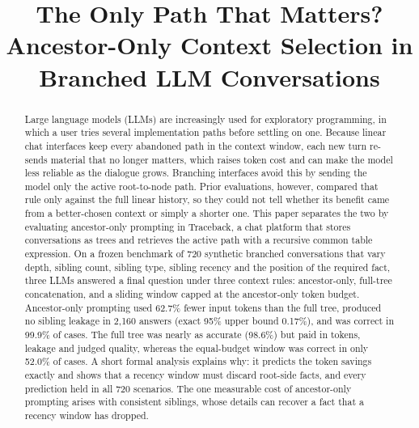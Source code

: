 \documentclass[conference]{IEEEtran}
\theoremstyle{definition}
\begin{document}
\title{The Only Path That Matters? Ancestor-Only Context Selection in Branched LLM Conversations}

\author{
}

\maketitle

\begin{abstract}
Large language models (LLMs) are increasingly used for exploratory programming, in which a user tries several implementation paths before settling on one. Because linear chat interfaces keep every abandoned path in the context window, each new turn re-sends material that no longer matters, which raises token cost and can make the model less reliable as the dialogue grows. Branching interfaces avoid this by sending the model only the active root-to-node path. Prior evaluations, however, compared that rule only against the full linear history, so they could not tell whether its benefit came from a better-chosen context or simply a shorter one. This paper separates the two by evaluating ancestor-only prompting in Traceback, a chat platform that stores conversations as trees and retrieves the active path with a recursive common table expression. On a frozen benchmark of 720 synthetic branched conversations that vary depth, sibling count, sibling type, sibling recency and the position of the required fact, three LLMs answered a final question under three context rules: ancestor-only, full-tree concatenation, and a sliding window capped at the ancestor-only token budget. Ancestor-only prompting used 62.7\% fewer input tokens than the full tree, produced no sibling leakage in 2{,}160 answers (exact 95\% upper bound 0.17\%), and was correct in 99.9\% of cases. The full tree was nearly as accurate (98.6\%) but paid in tokens, leakage and judged quality, whereas the equal-budget window was correct in only 52.0\% of cases. A short formal analysis explains why: it predicts the token savings exactly and shows that a recency window must discard root-side facts, and every prediction held in all 720 scenarios. The one measurable cost of ancestor-only prompting arises with consistent siblings, whose details can recover a fact that a recency window has dropped.
\end{abstract}
\end{document}
